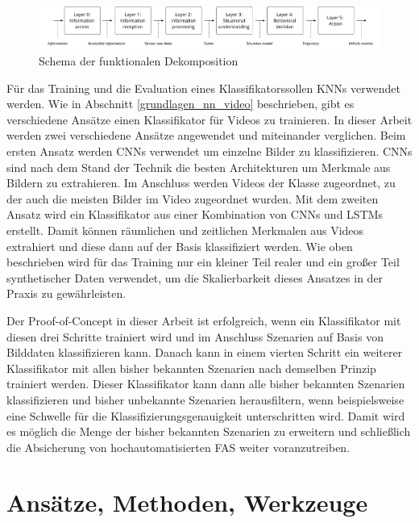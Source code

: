 \begin{figure}[h]
\centering
\includegraphics[scale=0.45]{images/funktionale_dekomposition.pdf}
\caption{Schema der funktionalen Dekomposition \cite{amersbach2017functional}}
\label{fig_functional_decomposition}
\end{figure}

Für das Training und die Evaluation eines Klassifikatorssollen \acp{KNN} verwendet werden. Wie in Abschnitt \ref{grundlagen_nn_video} beschrieben, gibt es verschiedene Ansätze einen Klassifikator für Videos zu trainieren. In dieser Arbeit werden zwei verschiedene Ansätze angewendet und miteinander verglichen. Beim ersten Ansatz werden \acp{CNN} verwendet um einzelne Bilder zu klassifizieren. \acp{CNN} sind nach dem Stand der Technik die besten Architekturen um Merkmale aus Bildern zu extrahieren. Im Anschluss werden Videos der Klasse zugeordnet, zu der auch die meisten Bilder im Video zugeordnet wurden. Mit dem zweiten Ansatz wird ein Klassifikator aus einer Kombination von \acp{CNN} und \acp{LSTM} erstellt. Damit können räumlichen und zeitlichen Merkmalen aus Videos extrahiert und diese dann auf der Basis klassifiziert werden. Wie oben beschrieben wird für das Training nur ein kleiner Teil realer und ein großer Teil synthetischer Daten verwendet, um die Skalierbarkeit dieses Ansatzes in der Praxis zu gewährleisten.

Der Proof-of-Concept in dieser Arbeit ist erfolgreich, wenn ein Klassifikator mit diesen drei Schritte trainiert wird und im Anschluss Szenarien auf Basis von Bilddaten klassifizieren kann. Danach kann in einem vierten Schritt ein weiterer Klassifikator mit allen bisher bekannten Szenarien nach demselben Prinzip trainiert werden. Dieser Klassifikator kann dann alle bisher bekannten Szenarien klassifizieren und bisher unbekannte Szenarien herausfiltern, wenn beispielsweise eine Schwelle für die Klassifizierungsgenauigkeit unterschritten wird. Damit wird es möglich die Menge der bisher bekannten Szenarien zu erweitern und schließlich die Absicherung von hochautomatisierten \ac{FAS} weiter voranzutreiben.

\section{Ansätze, Methoden, Werkzeuge}
\label{konzept_methodik}

